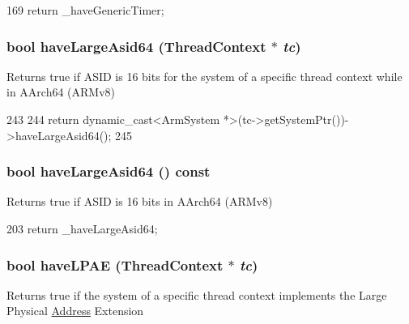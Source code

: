 \begin{DoxyCode}
169 { return _haveGenericTimer; }
\end{DoxyCode}
\hypertarget{classArmSystem_a7a86a1f7da253ac26a3bc9891e49e6cf}{
\subsubsection[{haveLargeAsid64}]{\setlength{\rightskip}{0pt plus 5cm}bool haveLargeAsid64 ({\bf ThreadContext} $\ast$ {\em tc})}}
\label{classArmSystem_a7a86a1f7da253ac26a3bc9891e49e6cf}
Returns true if ASID is 16 bits for the system of a specific thread context while in AArch64 (ARMv8) 


\begin{DoxyCode}
243 {
244     return dynamic_cast<ArmSystem *>(tc->getSystemPtr())->haveLargeAsid64();
245 }
\end{DoxyCode}
\hypertarget{classArmSystem_a47958664a46869f3fb4f9b043da32be5}{
\subsubsection[{haveLargeAsid64}]{\setlength{\rightskip}{0pt plus 5cm}bool haveLargeAsid64 () const}}
\label{classArmSystem_a47958664a46869f3fb4f9b043da32be5}
Returns true if ASID is 16 bits in AArch64 (ARMv8) 


\begin{DoxyCode}
203 { return _haveLargeAsid64; }
\end{DoxyCode}
\hypertarget{classArmSystem_aaab5472ead2be1873fa192e1f196b78b}{
\subsubsection[{haveLPAE}]{\setlength{\rightskip}{0pt plus 5cm}bool haveLPAE ({\bf ThreadContext} $\ast$ {\em tc})}}
\label{classArmSystem_aaab5472ead2be1873fa192e1f196b78b}
Returns true if the system of a specific thread context implements the Large Physical \hyperlink{classAddress}{Address} Extension 


